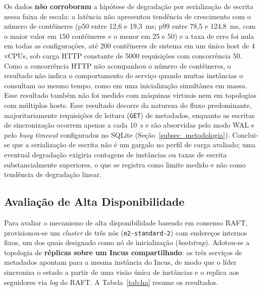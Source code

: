 Os dados \textbf{não corroboram} a hipótese de degradação por serialização de escrita nessa faixa de escala: a latência não apresentou tendência de crescimento com o número de contêineres (p50 entre 12{,}6 e 19{,}3~ms; p99 entre 78{,}5 e 124{,}8~ms, com o maior valor em 150 contêineres e o menor em 25 e 50) e a taxa de erro foi nula em todas as configurações, até 200 contêineres de sistema em um único host de 4 vCPUs, sob carga HTTP constante de 5000 requisições com concorrência 50. Como a concorrência HTTP não acompanhou o número de contêineres, o resultado não indica o comportamento do serviço quando muitas instâncias o consultam ao mesmo tempo, como em uma inicialização simultânea em massa. Esse resultado também não foi medido com máquinas virtuais nem em topologias com múltiplos hosts. Esse resultado decorre da natureza do fluxo predominante, majoritariamente requisições de leitura (\texttt{GET}) de metadados, enquanto as escritas de sincronização ocorrem apenas a cada 10~s e são absorvidas pelo modo WAL e pelo \textit{busy timeout} configurados no SQLite (Seção~\ref{subsec_metodologia}). Conclui-se que a serialização de escrita não é um gargalo no perfil de carga avaliado; uma eventual degradação exigiria contagens de instâncias ou taxas de escrita substancialmente superiores, o que se registra como limite medido e não como tendência de degradação linear.

\subsection{Avaliação de Alta Disponibilidade}
\label{subsec_avaliacao_ha}

Para avaliar o mecanismo de alta disponibilidade baseado em consenso RAFT, provisionou-se um \textit{cluster} de três nós (\texttt{e2-standard-2}) com endereços internos fixos, um dos quais designado como nó de inicialização (\textit{bootstrap}). Adotou-se a topologia de \textbf{réplicas sobre um Incus compartilhado}: os três serviços de metadados apontam para a mesma instância do Incus, de modo que o líder sincroniza o estado a partir de uma visão única de instâncias e o replica aos seguidores via \textit{log} do RAFT. A Tabela~\ref{tab:ha} resume os resultados.


